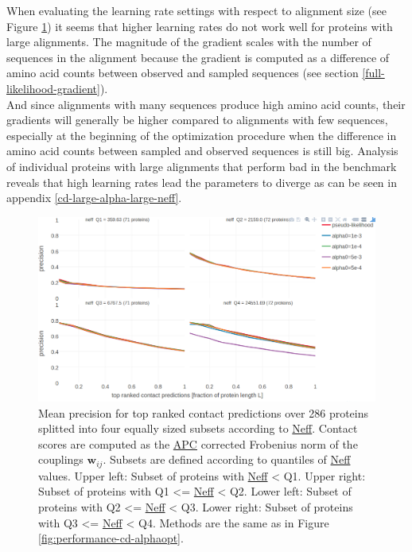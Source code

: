 \documentclass[12pt,a4paper,twoside]{book}
\newcommand{\wij}{\mathbf{w}_{ij}}
\theoremstyle{definition}
\theoremstyle{definition}
\theoremstyle{remark}
\begin{document}
When evaluating the learning rate settings with respect to alignment
size (see Figure \ref{fig:performance-cd-alphaopt-neff}) it seems that
higher learning rates do not work well for proteins with large
alignments. The magnitude of the gradient scales with the number of
sequences in the alignment because the gradient is computed as a
difference of amino acid counts between observed and sampled sequences
(see section \ref{full-likelihood-gradient}).\\
And since alignments with many sequences produce high amino acid counts,
their gradients will generally be higher compared to alignments with few
sequences, especially at the beginning of the optimization procedure
when the difference in amino acid counts between sampled and observed
sequences is still big. Analysis of individual proteins with large
alignments that perform bad in the benchmark reveals that high learning
rates lead the parameters to diverge as can be seen in appendix
\ref{cd-large-alpha-large-neff}.















\begin{figure}

{\centering \includegraphics[width=0.9\linewidth]{img/full_likelihood/alpha_opt_precision_vs_rank_facetted_by_neff_notitle} 

}

\caption{Mean precision for top ranked
contact predictions over 286 proteins splitted into four equally sized
subsets according to \protect\hyperlink{abbrev}{Neff}. Contact scores
are computed as the \protect\hyperlink{abbrev}{APC} corrected Frobenius
norm of the couplings \(\wij\). Subsets are defined according to
quantiles of \protect\hyperlink{abbrev}{Neff} values. Upper left: Subset
of proteins with \protect\hyperlink{abbrev}{Neff} \textless{} Q1. Upper
right: Subset of proteins with Q1 \textless{}=
\protect\hyperlink{abbrev}{Neff} \textless{} Q2. Lower left: Subset of
proteins with Q2 \textless{}= \protect\hyperlink{abbrev}{Neff}
\textless{} Q3. Lower right: Subset of proteins with Q3 \textless{}=
\protect\hyperlink{abbrev}{Neff} \textless{} Q4. Methods are the same as
in Figure \ref{fig:performance-cd-alphaopt}.}\label{fig:performance-cd-alphaopt-neff}
\end{figure}
\end{document}

